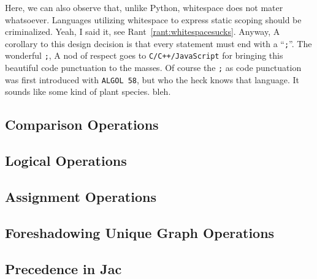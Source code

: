 
Here, we can also observe that, unlike Python, whitespace does not mater whatsoever. Languages utilizing whitespace to express static scoping should be criminalized. Yeah, I said it, see Rant~\ref{rant:whitespacesucks}. Anyway, A corollary to this design decision is that every statement must end with a ``\texttt{;}''. The wonderful \texttt{;}, A nod of respect goes to \texttt{C/C++/JavaScript} for bringing this beautiful code punctuation to the masses. Of course the \texttt{;} as code punctuation was first introduced with \texttt{ALGOL 58}, but who the heck knows that language. It sounds like some kind of plant species. \Gls{bleh}.


\subsection{Comparison Operations}


\subsection{Logical Operations}


\subsection*{Assignment Operations}


\subsection{Foreshadowing Unique Graph Operations}

\subsection{Precedence in Jac}

